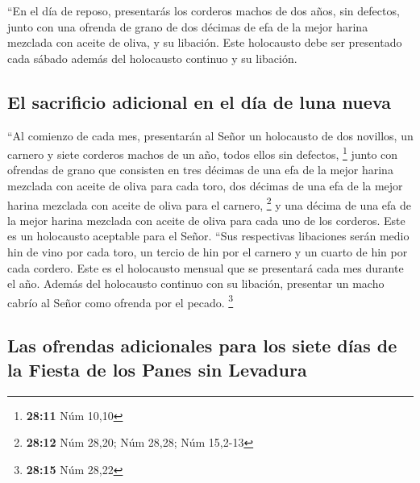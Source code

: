  ``En el día de reposo, presentarás los corderos machos de
dos años, sin defectos, junto con una ofrenda de grano de dos décimas de
efa de la mejor harina mezclada con aceite de oliva, y su libación.
 Este holocausto debe ser presentado cada sábado además
del holocausto continuo y su libación.

\hypertarget{el-sacrificio-adicional-en-el-duxeda-de-luna-nueva}{%
\subsection{El sacrificio adicional en el día de luna
nueva}\label{el-sacrificio-adicional-en-el-duxeda-de-luna-nueva}}

 ``Al comienzo de cada mes, presentarán al Señor un
holocausto de dos novillos, un carnero y siete corderos machos de un
año, todos ellos sin defectos, \footnote{\textbf{28:11} Núm 10,10}
 junto con ofrendas de grano que consisten en tres
décimas de una efa de la mejor harina mezclada con aceite de oliva para
cada toro, dos décimas de una efa de la mejor harina mezclada con aceite
de oliva para el carnero, \footnote{\textbf{28:12} Núm 28,20; Núm 28,28;
  Núm 15,2-13}  y una décima de una efa de la mejor
harina mezclada con aceite de oliva para cada uno de los corderos. Este
es un holocausto aceptable para el Señor.  ``Sus
respectivas libaciones serán medio hin de vino por cada toro, un tercio
de hin por el carnero y un cuarto de hin por cada cordero. Este es el
holocausto mensual que se presentará cada mes durante el año.
 Además del holocausto continuo con su libación,
presentar un macho cabrío al Señor como ofrenda por el pecado.
\footnote{\textbf{28:15} Núm 28,22}

\hypertarget{las-ofrendas-adicionales-para-los-siete-duxedas-de-la-fiesta-de-los-panes-sin-levadura}{%
\subsection{Las ofrendas adicionales para los siete días de la Fiesta de
los Panes sin
Levadura}\label{las-ofrendas-adicionales-para-los-siete-duxedas-de-la-fiesta-de-los-panes-sin-levadura}}

